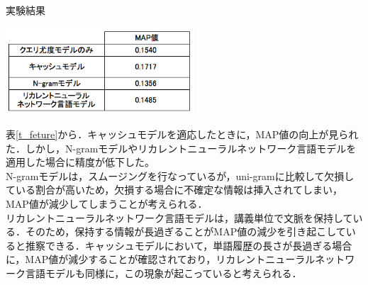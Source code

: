 \begin{table}[h]
    \centering
    \caption{実験結果}
    \includegraphics[width=7cm]{./image/t_feature2.png}
    \label{t_feture_res}
\end{table}

表\ref{t_feture}から．キャッシュモデルを適応したときに，MAP値の向上が見られた．しかし，N-gramモデルやリカレントニューラルネットワーク言語モデルを適用した場合に精度が低下した。 \\
N-gramモデルは，スムージングを行なっているが，uni-gramに比較して欠損している割合が高いため，欠損する場合に不確定な情報は挿入されてしまい，MAP値が減少してしまうことが考えられる． \\
リカレントニューラルネットワーク言語モデルは，講義単位で文脈を保持している．そのため，保持する情報が長過ぎることがMAP値の減少を引き起こしていると推察できる．キャッシュモデルにおいて，単語履歴の長さが長過ぎる場合に，MAP値が減少することが確認されており，リカレントニューラルネットワーク言語モデルも同様に，この現象が起こっていると考えられる．